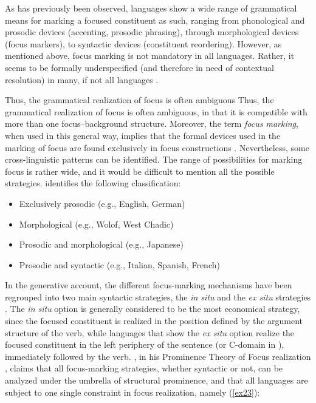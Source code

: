 As has previously been observed, languages show a wide range of grammatical means for marking a focused constituent as such, ranging from phonological and prosodic devices (accenting, prosodic phrasing), through morphological devices (focus markers), to syntactic devices (constituent reordering).
However, as mentioned above, focus marking is not mandatory in all languages. Rather, it seems to be formally underspecified (and therefore in need of contextual resolution) in many, if not all languages \parencite{zimmermann2011grammatical}. 

Thus, the grammatical realization of focus is often ambiguous Thus, the grammatical realization of focus is often ambiguous, in that it is compatible with more than one focus–background structure. Moreover, the term \textit{focus marking}, when used in this general way, implies that the formal devices used in the marking of focus are found exclusively in focus constructions \parencite{fiedler2006subject}.
Nevertheless, some cross-linguistic patterns can be identified. The range of possibilities for marking focus is rather wide, and it would be difficult to mention all the possible strategies. \textcite{lambrecht1996information} identifies the following classification: 

\begin{itemize}
    \item Exclusively prosodic (e.g., English, German)
    \vspace{-0.3cm}
    \item Morphological (e.g., Wolof, West Chadic)
     \vspace{-0.3cm}
    \item Prosodic and morphological (e.g., Japanese)
     \vspace{-0.3cm}
    \item Prosodic and syntactic (e.g., Italian, Spanish, French)
     \vspace{-0.3cm}
\end{itemize}

 In the generative account, the different focus-marking mechanisms have been regrouped into two main syntactic strategies, the \textit{in situ} and the \textit{ex situ} strategies \parencite{aboh2008focus}. The \textit{in situ} option is generally considered to be the most economical strategy, since the focused constituent is realized in the position defined by the argument structure of the verb, while languages that show the \textit{ex situ} option realize the focused constituent in the left periphery of the sentence (or C-domain in \cite{rizzi1997fine}), immediately followed by the verb. 
\textcite{buring2009towards}, in his Prominence Theory of Focus realization
\parencite{truckenbrodt1995phonological, buring2009towards}, claims that all focus-marking strategies, whether syntactic or not, can be analyzed under the umbrella of structural prominence, and that all languages are subject to one single constraint in focus realization, namely (\ref{ex23}):

